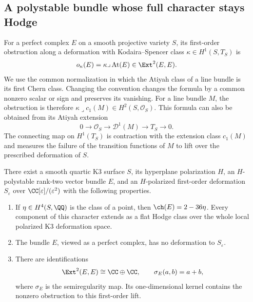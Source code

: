 \subsection{A polystable bundle whose full character stays Hodge}

For a perfect complex $E$ on a smooth projective variety $S$, its
first-order obstruction along a deformation with Kodaira--Spencer class
$\kappa\in H^1(S,T_S)$ is
\begin{equation}\label{v7:atiyah-obstruction}
 o_{\kappa}(E)=\kappa\lrcorner\operatorname{At}(E)
       \in\Ext^2(E,E).
\end{equation}
We use the common normalization in which the Atiyah class of a line
bundle is its first Chern class.  Changing the convention changes the
formula by a common nonzero scalar or sign and preserves its vanishing.
For a line bundle $M$, the obstruction is therefore
$\kappa\lrcorner c_1(M)\in H^2(S,\mathcal O_S)$.
This formula can also be obtained from its Atiyah extension
\[
 0\longrightarrow\mathcal O_S
  \longrightarrow\mathcal D^1(M)
  \longrightarrow T_S\longrightarrow0.
\]
The connecting map on $H^1(T_S)$ is contraction with the extension
class $c_1(M)$ and measures the failure of the transition functions of
$M$ to lift over the prescribed deformation of $S$.

\begin{theorem}\label{v7:k3-obstructed-bundle}
There exist a smooth quartic K3 surface $S$, its hyperplane polarization
$H$, an $H$-polystable rank-two vector bundle $E$, and an $H$-polarized
first-order deformation $S_{\varepsilon}$ over
$\CC[\varepsilon]/(\varepsilon^2)$ with the following properties.
\begin{enumerate}
\item If $\eta\in H^4(S,\QQ)$ is the class of a point, then
  $\ch(E)=2-36\eta$.  Every component of this character extends as a
  flat Hodge class over the whole local polarized K3 deformation space.
\item The bundle $E$, viewed as a perfect complex, has no deformation
  to $S_{\varepsilon}$.
\item There are identifications
  \[
   \Ext^2(E,E)\cong\CC\oplus\CC,
   \qquad
   \sigma_E(a,b)=a+b,
  \]
  where $\sigma_E$ is the semiregularity map.  Its one-dimensional
  kernel contains the nonzero obstruction to this first-order lift.
\end{enumerate}
\end{theorem}

